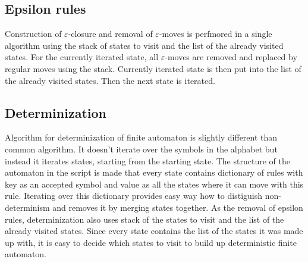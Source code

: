 \documentclass[12pt,a4paper,final]{article}
\begin{document}
\subsection{Epsilon rules}
Construction of $\varepsilon$-closure and removal of $\varepsilon$-moves is perfmored in a single algorithm using the stack of states to visit and the list of the already visited states. For the currently iterated state, all $\varepsilon$-moves are removed and replaced by regular moves using the stack. Currently iterated state is then put into the list of the already visited states. Then the next state is iterated.
\subsection{Determinization}
Algorithm for determinization of finite automaton is slightly different than common algorithm. It doesn't iterate over the symbols in the alphabet but instead it iterates states, starting from the starting state. The structure of the automaton in the script is made that every state contains dictionary of rules with key as an accepted symbol and value as all the states where it can move with this rule. Iterating over this dictionary provides easy way how to distiguish non-determinism and removes it by merging states together. As the removal of epsilon rules, determinization also uses stack of the states to visit and the list of the already visited states. Since every state contains the list of the states it was made up with, it is easy to decide which states to visit to build up deterministic finite automaton.
\end{document}
